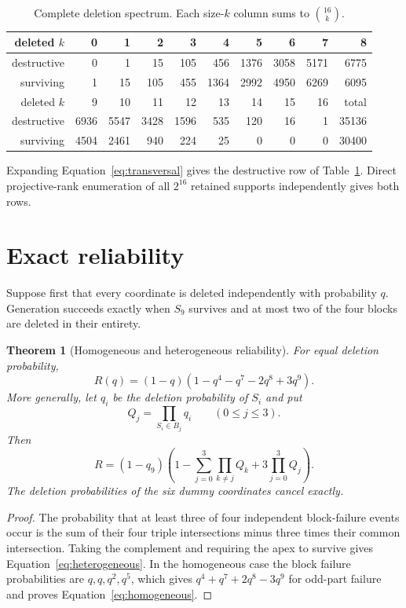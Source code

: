 \documentclass[10pt]{article}
\newtheorem{theorem}{Theorem}
\begin{document}
\begin{table}[htbp]
\centering
\small
\setlength{\tabcolsep}{4.2pt}
\begin{tabular}{r|rrrrrrrrr}
\toprule
deleted $k$&0&1&2&3&4&5&6&7&8\\
\midrule
destructive&0&1&15&105&456&1376&3058&5171&6775\\
surviving&1&15&105&455&1364&2992&4950&6269&6095\\
\midrule
deleted $k$&9&10&11&12&13&14&15&16&total\\
\midrule
destructive&6936&5547&3428&1596&535&120&16&1&35136\\
surviving&4504&2461&940&224&25&0&0&0&30400\\
\bottomrule
\end{tabular}
\caption{Complete deletion spectrum.  Each size-$k$ column sums to
$\binom{16}{k}$.}
\label{tab:deletion}
\end{table}

Expanding Equation~\eqref{eq:transversal} gives the destructive row of
Table~\ref{tab:deletion}.  Direct projective-rank enumeration of all $2^{16}$
retained supports independently gives both rows.

\section{Exact reliability}
Suppose first that every coordinate is deleted independently with probability
$q$.  Generation succeeds exactly when $S_9$ survives and at most two of the
four blocks are deleted in their entirety.

\begin{theorem}[Homogeneous and heterogeneous reliability]
For equal deletion probability,
\begin{equation}\label{eq:homogeneous}
 R(q)=(1-q)(1-q^4-q^7-2q^8+3q^9).
\end{equation}
More generally, let $q_i$ be the deletion probability of $S_i$ and put
\[
 Q_j=\prod_{S_i\in B_j}q_i\qquad(0\leq j\leq3).
\]
Then
\begin{equation}\label{eq:heterogeneous}
 R=(1-q_9)\left(
 1-\sum_{j=0}^3\prod_{k\ne j}Q_k+3\prod_{j=0}^3Q_j
 \right).
\end{equation}
The deletion probabilities of the six dummy coordinates cancel exactly.
\end{theorem}

\begin{proof}
The probability that at least three of four independent block-failure events
occur is the sum of their four triple intersections minus three times their
common intersection.  Taking the complement and requiring the apex to survive
gives Equation~\eqref{eq:heterogeneous}.  In the homogeneous case the block
failure probabilities are $q,q,q^2,q^5$, which gives
$q^4+q^7+2q^8-3q^9$ for odd-part failure and proves
Equation~\eqref{eq:homogeneous}.
\end{proof}
\end{document}
